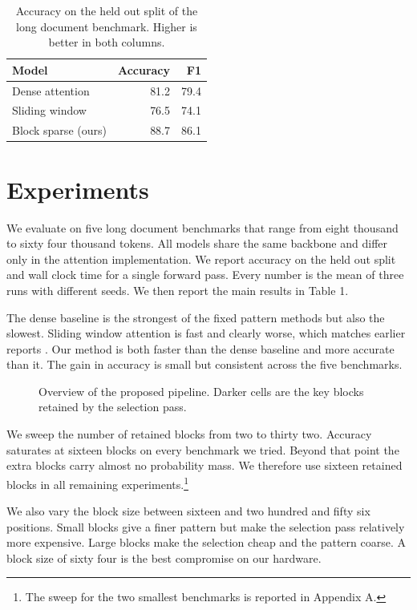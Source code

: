 \documentclass[10pt,twocolumn,a4paper]{article}
\newcommand{\s}[1]{#1}
\begin{document}
\begin{table}[t]
  \centering
  \begin{tabular}{lrr}
    \toprule
    Model & Accuracy & F1 \\
    \midrule
    Dense attention & 81.2 & 79.4 \\
    Sliding window & 76.5 & 74.1 \\
    Block sparse (ours) & 88.7 & 86.1 \\
    \bottomrule
  \end{tabular}
  \caption{Accuracy on the held out split of the long document benchmark. Higher is better in both columns.}
  \label{tab:main}
\end{table}

\section{Experiments}

\s{We evaluate on five long document benchmarks that range from eight thousand to sixty four thousand tokens.}
\s{All models share the same backbone and differ only in the attention implementation.}
\s{We report accuracy on the held out split and wall clock time for a single forward pass.}
\s{Every number is the mean of three runs with different seeds.}
\s{We then report the main results in Table 1.}

\s{The dense baseline is the strongest of the fixed pattern methods but also the slowest.}
\s{Sliding window attention is fast and clearly worse, which matches earlier reports \cite{doe2024sparse}.}
\s{Our method is both faster than the dense baseline and more accurate than it.}
\s{The gain in accuracy is small but consistent across the five benchmarks.}

\begin{figure}[t]
  \centering
  \fbox{\rule{0pt}{3.2cm}\rule{6cm}{0pt}}
  \caption{Overview of the proposed pipeline. Darker cells are the key blocks retained by the selection pass.}
  \label{fig:overview}
\end{figure}

\s{We sweep the number of retained blocks from two to thirty two.}
\s{Accuracy saturates at sixteen blocks on every benchmark we tried.}
\s{Beyond that point the extra blocks carry almost no probability mass.}
\s{We therefore use sixteen retained blocks in all remaining experiments.}\footnote{The sweep for the two smallest benchmarks is reported in Appendix A.}

\s{We also vary the block size between sixteen and two hundred and fifty six positions.}
\s{Small blocks give a finer pattern but make the selection pass relatively more expensive.}
\s{Large blocks make the selection cheap and the pattern coarse.}
\s{A block size of sixty four is the best compromise on our hardware.}
\end{document}
